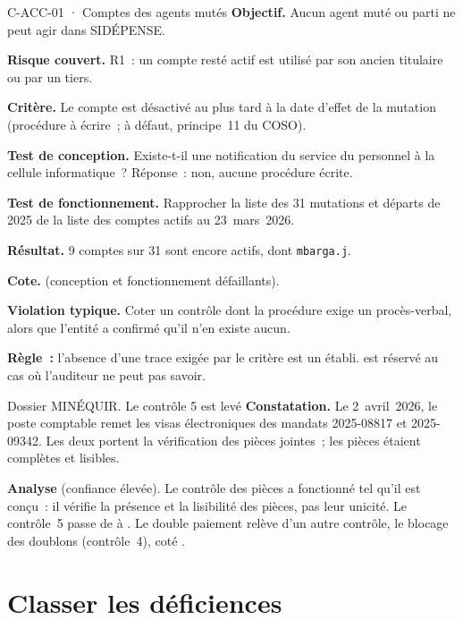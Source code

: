 \begin{boxobjet}{C-ACC-01 · Comptes des agents mutés}
\textbf{Objectif.} Aucun agent muté ou parti ne peut agir dans
SIDÉPENSE.

\textbf{Risque couvert.} R1~: un compte resté actif est utilisé par son
ancien titulaire ou par un tiers.

\textbf{Critère.} Le compte est désactivé au plus tard à la date d'effet
de la mutation (procédure à écrire~; à défaut, principe~11 du COSO).

\textbf{Test de conception.} Existe-t-il une notification du service du
personnel à la cellule informatique~? Réponse~: non, aucune procédure
écrite.

\textbf{Test de fonctionnement.} Rapprocher la liste des 31 mutations et
départs de 2025 de la liste des comptes actifs au 23~mars~2026.

\textbf{Résultat.} 9 comptes sur 31 sont encore actifs, dont
\texttt{mbarga.j}.

\textbf{Cote.} \NON{} (conception et fonctionnement défaillants).
\end{boxobjet}

\begin{boxalert}
\textbf{Violation typique.} Coter \NEK{} un contrôle dont la procédure
exige un procès-verbal, alors que l'entité a confirmé qu'il n'en existe
aucun.

\smallskip
\textbf{Règle~:} l'absence d'une trace exigée par le critère est un \NON{}
établi. \NEK{} est réservé au cas où l'auditeur ne peut pas savoir.
\end{boxalert}

\begin{boxscenario}{Dossier MINÉQUIR. Le contrôle 5 est levé}
\textbf{Constatation.} Le 2~avril~2026, le poste comptable remet les
visas électroniques des mandats 2025-08817 et 2025-09342. Les deux
portent la vérification des pièces jointes~; les pièces étaient
complètes et lisibles.

\medskip
\textbf{Analyse} (confiance élevée). Le contrôle des pièces a fonctionné
tel qu'il est conçu~: il vérifie la présence et la lisibilité des pièces,
pas leur unicité. Le contrôle~5 passe de \NEK{} à \OUI{}. Le double
paiement relève d'un autre contrôle, le blocage des doublons (contrôle~4),
coté \NON{}.
\end{boxscenario}

\separateur

\section{Classer les déficiences}
\label{sec:c03-deficiences}

